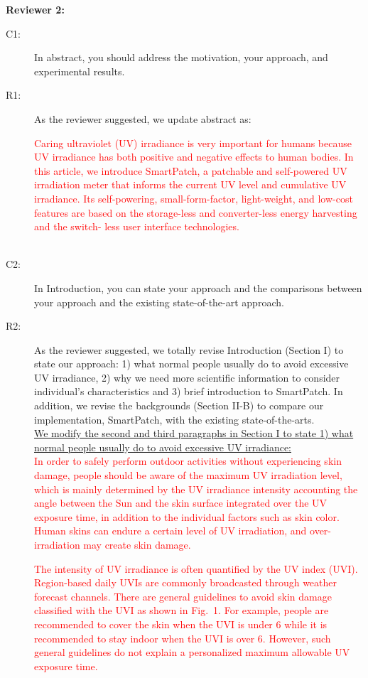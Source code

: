 \documentclass[onecolumn]{IEEEconf}
\begin{document}
\textbf{Reviewer 2:}
\begin{description}
\item [C1: ] In abstract, you should address the motivation, your approach, and experimental results.

\item [R1: ] As the reviewer suggested, we update abstract as:

\textcolor{red}{Caring ultraviolet (UV) irradiance is very important for humans because UV irradiance has both positive and negative effects to human bodies. In this article, we introduce SmartPatch, a patchable and self-powered UV irradiation meter that informs the current UV level and cumulative UV irradiance. Its self-powering, small-form-factor, light-weight, and low-cost features are based on the storage-less and converter-less energy harvesting and the switch- less user interface technologies.}\\
~\\

\item [C2: ] In Introduction, you can state your approach and the comparisons between your approach and the existing state-of-the-art approach.
\item [R2: ] As the reviewer suggested, we totally revise Introduction (Section I) to state our approach: 1) what normal people usually do to avoid excessive UV irradiance, 2) why we need more scientific information to consider individual's characteristics and 3) brief introduction to SmartPatch. In addition, we revise the backgrounds (Section II-B) to compare our implementation, SmartPatch, with the existing state-of-the-arts.\\

\uline{We modify the second and third paragraphs in Section I to state 1) what normal people usually do to avoid excessive UV irradiance:}\\
%
\textcolor{red}{In order to safely perform outdoor activities without experiencing skin damage, people should be aware of  the maximum UV irradiation level, which is mainly determined by the UV irradiance intensity accounting the angle between the Sun and the skin surface integrated over the UV exposure time, in addition to the individual factors such as skin color. Human skins can endure a certain level of UV irradiation, and over-irradiation may create skin damage.}

\textcolor{red}{The intensity of UV irradiance is often quantified by the UV index (UVI). Region-based daily UVIs are commonly broadcasted through weather forecast channels. There are general guidelines to avoid skin damage classified with  the UVI as shown in Fig.~1. For example, people are recommended to cover the skin when the UVI is under 6 while it is recommended to stay indoor when the UVI  is over 6. However, such general guidelines do not explain a personalized maximum allowable UV exposure time.}\\


\end{description}
\end{document}
